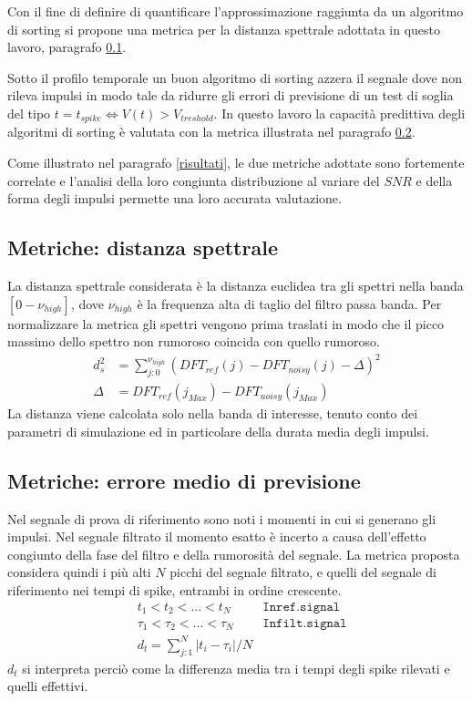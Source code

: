 \documentclass[9pt,twocolumn,twoside]{osajnl}
\begin{document}
Con il fine di definire di quantificare l'approssimazione raggiunta da un algoritmo di sorting si propone una metrica per la distanza spettrale adottata in questo lavoro, paragrafo \ref{metricaS}.

Sotto il profilo temporale un buon algoritmo di sorting azzera il segnale dove non rileva impulsi in modo tale da ridurre gli errori di previsione di un test di soglia del tipo
$t = t_{spike} \Leftrightarrow V(t) > V_{treshold}$. In questo lavoro la capacità predittiva degli algoritmi di sorting è valutata con la metrica illustrata nel paragrafo \ref{metricaT}.

Come illustrato nel paragrafo \ref{risultati}, le due metriche adottate sono fortemente correlate e l'analisi della loro congiunta distribuzione al variare del $SNR$ e della forma degli impulsi permette una loro accurata valutazione.


\subsection{Metriche: distanza spettrale}
\label{metricaS}

La distanza spettrale considerata è la distanza euclidea tra gli spettri nella banda $[0-\nu_{high}]$, dove $\nu_{high}$ è la frequenza alta di taglio del filtro passa banda. Per normalizzare la metrica gli spettri vengono prima traslati in modo che il picco massimo dello spettro non rumoroso coincida con quello rumoroso.
%
\begin{align*}
 d_{s}^2 & = \sum_{j:0}^{\nu_{high}}(DFT_{ref}(j) - DFT_{noisy}(j) - \Delta)^2 \\
 \Delta  & = DFT_{ref}(j_{Max}) - DFT_{noisy}(j_{Max})
\end{align*}
%
La distanza viene calcolata solo nella banda di interesse, tenuto conto dei parametri di simulazione ed in particolare della durata media degli impulsi.



\subsection{Metriche: errore medio di previsione}
\label{metricaT}

Nel segnale di prova di riferimento sono noti i momenti in cui si generano gli impulsi.
Nel segnale filtrato il momento esatto è incerto a causa dell'effetto congiunto della fase del filtro e della rumorosità del segnale. La metrica proposta considera quindi i più alti $N$ picchi del segnale filtrato, e quelli del segnale di riferimento nei tempi di spike, entrambi in ordine crescente.
%
\begin{align*}
 & t_{1} < t_{2} < ... < t_{N} & \mathtt{In ref. signal}\\
 & \tau_{1} < \tau_{2} < ... < \tau_{N} & \mathtt{In filt. signal}\\
 & d_{t} = \sum_{j:1}^{N} |t_{i} - \tau_{i}| / N
 \end{align*}
%
$d_{t}$ si interpreta perciò come la differenza media tra i tempi degli spike rilevati e quelli effettivi. 
\end{document}
